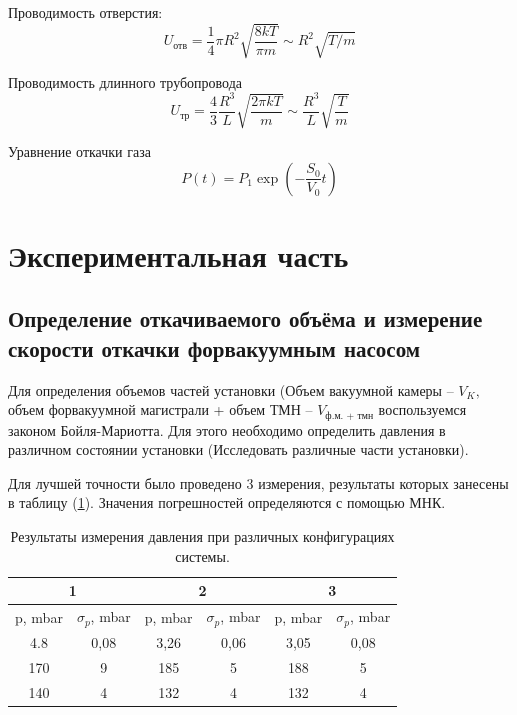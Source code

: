\documentclass[12pt,a4paper]{article}
\begin{document}
		Проводимость отверстия:
	\begin{equation}
		U_{\text{отв}} = \frac{1}{4} \pi R^{2} \sqrt{\frac{8kT}{\pi m}} \sim R^{2}\sqrt{T/m}
	\end{equation}
	
		Проводимость длинного трубопровода
	\begin{equation}
		U_{\text{тр}} = \frac{4}{3} \frac{R^{3}}{L} \sqrt{\frac{2\pi kT}{m}} \sim \frac{R^{3}}{L} \sqrt{\frac{T}{m}} 
	\end{equation}
	
		Уравнение откачки газа
	\begin{equation}
		P\left( t \right) = P_{1}\exp \left(- \frac{S_{0}}{V_{0}}t \right)
	\end{equation}
	
	
\section{Экспериментальная часть}

	\subsection{Определение откачиваемого объёма и измерение скорости откачки форвакуумным насосом}
	
	Для определения объемов частей установки (Объем вакуумной камеры -- $V_{K},$  объем форвакуумной магистрали + объем ТМН -- $V_{\text{ф.м. + тмн}}$ воспользуемся законом Бойля-Мариотта. Для этого необходимо определить давления в различном состоянии установки (Исследовать различные части установки).
	
	Для лучшей точности было проведено 3 измерения, результаты которых занесены в таблицу (\ref{tab:results_of_measuring_for_value}). Значения погрешностей определяются с помощью МНК.
	
	\begin{table}[h]
	\centering
		\begin{tabular}{|c|c|c|c|c|c|}
		\hline
		\multicolumn{2}{|c|}{1} & \multicolumn{2}{c|}{2} & \multicolumn{2}{c|}{3} \\ \hline
		p, mbar  & $\sigma_{p}$, mbar & p, mbar & $\sigma_{p}$, mbar & p, mbar & $\sigma_{p}$, mbar \\ \hline
		4.8     & 0,08         & 3,26    & 0,06         & 3,05    & 0,08         \\ \hline
		170      & 9            & 185     & 5            & 188     & 5            \\ \hline
		140      & 4            & 132     & 4            & 132     & 4            \\ \hline
		\end{tabular}
		\caption{Результаты измерения давления при различных конфигурациях системы.}
		\label{tab:results_of_measuring_for_value}
	\end{table}
	
\end{document}
